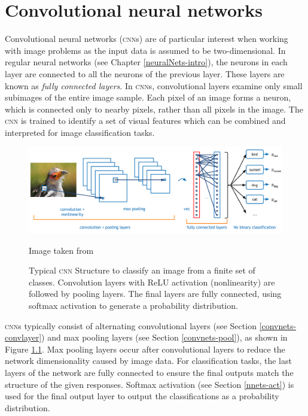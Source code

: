 %
%

\chapter{Convolutional neural networks}\label{convnets}

Convolutional neural networks (\textsc{cnn}s) are of particular interest when working with image problems as the input data is assumed to be two-dimensional. In regular neural networks (see Chapter \ref{neuralNets-intro}), the neurons in each layer are connected to all the neurons of the previous layer. These layers are known as \textit{fully connected layers}. In \textsc{cnn}s, convolutional layers examine only small subimages of the entire image sample. Each pixel of an image forms a neuron, which is connected only to nearby pixels, rather than all pixels in the image. The \textsc{cnn} is trained to identify a set of visual features which can be combined and interpreted for image classification tasks.

\begin{figure}[ht]
	\centering
	\includegraphics[width=\textwidth]{Images/4_cnn_structure.png}
	\caption{\small{Typical \textsc{cnn} Structure to classify an image from a finite set of classes. Convolution layers with ReLU activation (nonlinearity) are followed by pooling layers. The final layers are fully connected, using softmax activation to generate a probability distribution.}}
	\small Image taken from \cite{ADeshpande2016}
	\label{convnets-structurefig}
\end{figure}

\textsc{cnn}s typically consist of alternating convolutional layers (see Section \ref{convnets-convlayer}) and max pooling layers (see Section \ref{convnets-pool}), as shown in Figure \ref{convnets-structurefig}. Max pooling layers occur after convolutional layers to reduce the network dimensionality caused by image data. For classification tasks, the last layers of the network are fully connected to ensure the final outputs match the structure of the given responses. Softmax activation (see Section \ref{nnets-act}) is used for the final output layer to output the classifications as a probability distribution.

